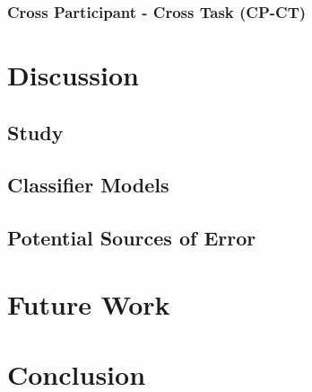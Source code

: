 \documentclass[11pt]{article}
\begin{document}
		\subsubsection{Cross Participant - Cross Task (CP-CT)}

		
\section{Discussion}

	\subsection{Study}
	
	\subsection{Classifier Models}
	
	\subsection{Potential Sources of Error}

\section{Future Work}
	
\section{Conclusion}


\pagebreak

\end{document}
